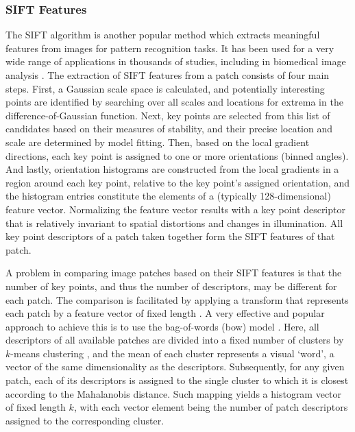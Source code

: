 \subsubsection{SIFT Features}
\label{subsubsec:sift-and-bow}
The SIFT algorithm \cite{lowe2004distinctive} is another popular method which extracts meaningful features from images for pattern recognition tasks. It has been used for a very wide range of applications in thousands of studies, including in biomedical image analysis \cite{ni2009reconstruction, jiang2010live, mualla2013automatic, zhang2013nonrigid, ni2009reconstruction, yu2016fast}. The extraction of SIFT features from a patch consists of four main steps. First, a Gaussian scale space is calculated, and potentially interesting points are identified by searching over all scales and locations for extrema in the difference-of-Gaussian function. Next, key points are selected from this list of candidates based on their measures of stability, and their precise location and scale are determined by model fitting. Then, based on the local gradient directions, each key point is assigned to one or more orientations (binned angles). And lastly, orientation histograms are constructed from the local gradients in a region around each key point, relative to the key point's assigned orientation, and the histogram entries constitute the elements of a (typically 128-dimensional) feature vector. Normalizing the feature vector results with a key point descriptor that is relatively invariant to spatial distortions and changes in illumination. All key point descriptors of a patch taken together form the SIFT features of that patch.

A problem in comparing image patches based on their SIFT features is that the number of key points, and thus the number of descriptors, may be different for each patch. The comparison is facilitated by applying a transform that represents each patch by a feature vector of fixed length \cite{yang2009linear}. A very effective and popular approach to achieve this is to use the bag-of-words (\gls{bow}) model \cite{fei2005bayesian}. Here, all descriptors of all available patches are divided into a fixed number of clusters by $k$-means clustering \cite{macqueen1967some}, and the mean of each cluster represents a visual `word', a vector of the same dimensionality as the descriptors. Subsequently, for any given patch, each of its descriptors is assigned to the single cluster to which it is closest according to the Mahalanobis distance. Such mapping yields a histogram vector of fixed length $k$, with each vector element being the number of patch descriptors assigned to the corresponding cluster.

